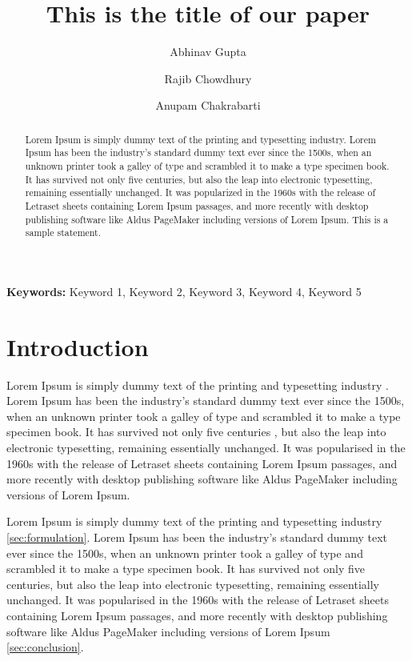 \documentclass[10pt,a4paper, oneside]{article}
\theoremstyle{remark}
\providecommand{\keywords}[1]{\textbf{{Keywords:}} #1}
\begin{document}
	\title{This is the title of our paper}
	\author[1]{Abhinav Gupta}
	\author[1]{Rajib Chowdhury}
	\author[1]{Anupam Chakrabarti}

	\thispagestyle{empty}
	\newpage

	\maketitle
	\setcounter{page}{1}

	\begin{abstract}
		Lorem Ipsum is simply dummy text of the printing and typesetting industry. Lorem Ipsum has been the industry's standard dummy text ever since the 1500s, when an unknown printer took a galley of type and scrambled it to make a type specimen book. It has survived not only five centuries, but also the leap into electronic typesetting, remaining essentially unchanged. It was popularized in the 1960s with the release of Letraset sheets containing Lorem Ipsum passages, and more recently with desktop publishing software like Aldus PageMaker including versions of Lorem Ipsum. This is a sample statement.
	\end{abstract}
	\keywords{Keyword 1, Keyword 2, Keyword 3, Keyword 4, Keyword 5}
	\section{Introduction}
	Lorem Ipsum is simply dummy text of the printing and typesetting industry \citet{gupta55lineCodeLargescale2020}. Lorem Ipsum has been the industry's standard dummy text ever since the 1500s, when an unknown printer took a galley of type and scrambled it to make a type specimen book. It has survived not only five centuries \citep{guptaAutoadaptiveSubsteppingAlgorithm2020a,mandalLengthScaleInsensitive2020a}, but also the leap into electronic typesetting, remaining essentially unchanged. It was popularised in the 1960s with the release of Letraset sheets containing Lorem Ipsum passages, and more recently with desktop publishing software like Aldus PageMaker including versions of Lorem Ipsum.

	Lorem Ipsum is simply dummy text of the printing and typesetting industry \cref{sec:formulation}. Lorem Ipsum  has been the industry's standard dummy text ever since the 1500s, when an unknown printer took a galley of type and scrambled it to make a type specimen book. It has survived not only five centuries, but also the leap into electronic typesetting, remaining essentially unchanged. It was popularised in the 1960s with the release of Letraset sheets containing Lorem Ipsum passages, and more recently with desktop publishing software like Aldus PageMaker including versions of Lorem Ipsum \cref{sec:conclusion}.
\end{document}
